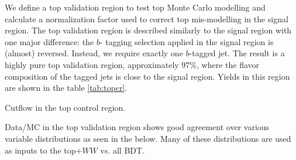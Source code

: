 We define a top validation region to test top Monte Carlo modelling and calculate a normalization factor used to correct top mis-modelling in the signal region. The top validation region is described similarly to the signal region with one major difference: the $b$- tagging selection applied in the signal region is (almost) reversed. Instead, we require exactly one $b$-tagged jet. The result is a highly pure top validation region, approximately $97\%$, where the flavor composition of the tagged jets is close to the signal region. Yields in this region are shown in the table \ref{tab:topcr}.

\begin{table}[h!]
\scalebox{0.55}{

}
\caption{Cutflow in the top control region.}
\label{tab:topcr}
\end{table}

Data/MC in the top validation region shows good agreement over various variable distributions as seen in the  below. Many of these distributions are used as inputs to the top$+WW$ vs. all BDT. 

